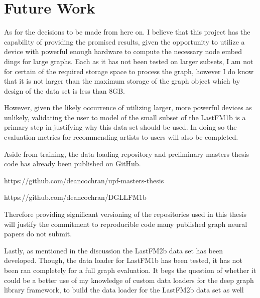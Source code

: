 
\section{Future Work}
As for the decisions to be made from here on. I believe that this project has the capability of providing the promised results, given the opportunity to utilize a device with powerful enough hardware to compute the necessary node embed dings for large graphs. Each as it has not been tested on larger subsets, I am not for certain of the required storage space to process the graph, however I do know that it is not larger than the maximum storage of the graph object which by design of the data set is less than 8GB.

However, given the likely occurrence of utilizing larger, more powerful devices as unlikely, validating the user to model of the small subset of the LastFM1b is a primary step in justifying why this data set should be used. In doing so the evaluation metrics for recommending artists to users will also be completed.

Aside from training, the data loading repository and preliminary masters thesis code has already been published on GitHub. 


https://github.com/deancochran/upf-masters-thesis

https://github.com/deancochran/DGL\textunderscore{}LFM1b



Therefore providing significant versioning of the repositories used in this thesis will justify the commitment to reproducible code many published graph neural papers do not submit.


Lastly, as mentioned in the discussion the LastFM2b data set has been developed. Though, the data loader for LastFM1b has been tested, it has not been ran completely for a full graph evaluation. It begs the question of whether it could be a better use of my knowledge of custom data loaders for the deep graph library framework, to build the data loader for the LastFM2b data set as well